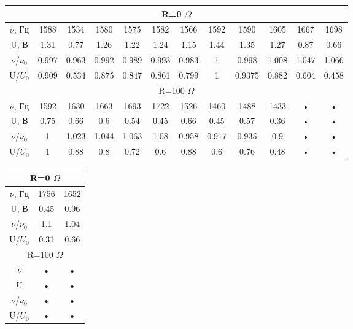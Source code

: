 \documentclass[a4paper,12pt]{article} %
\begin{document}
\begin{flushleft}

\begin {tabular}{|c|c|c|c|c|c|c|c|c|c|c|c|}
\hline 
\multicolumn{12}{|c|}{R=0 $\Omega$     }  \\ 
\hline 
$\nu$, Гц & 1588 & 1534 & 1580 & 1575 & 1582 & 1566 & 1592 & 1590 & 1605 & 1667 & 1698  \\ 
\hline 
U, В& 1.31 & 0.77 & 1.26 & 1.22 & 1.24 & 1.15 & 1.44 & 1.35 & 1.27 & 0.87 & 0.66  \\ 
\hline 
$\nu$/$\nu_0$ & 0.997 & 0.963 & 0.992 & 0.989 & 0.993 & 0.983 & 1 & 0.998 & 1.008 & 1.047 & 1.066  \\ 
\hline 
U/$U_0$ & 0.909 & 0.534 & 0.875 & 0.847 & 0.861 & 0.799 & 1 & 0.9375 & 0.882 & 0.604 & 0.458  \\ 
\hline 
\multicolumn{12}{|c|}{R=100 $\Omega$     }  \\  
\hline 
$\nu$, Гц & 1592 & 1630 & 1663 & 1693 & 1722 & 1526 & 1460 & 1488 & 1433 & • & •  \\ 
\hline 
U, В & 0.75 & 0.66 & 0.6 & 0.54 & 0.45 & 0.66 & 0.45 & 0.57 & 0.36 & • & • \\ 
\hline 
$\nu$/$\nu_0$ & 1 & 1.023 & 1.044 & 1.063 & 1.08 & 0.958 & 0.917 & 0.935 & 0.9 & • & •  \\ 
\hline 
U/$U_0$ & 1 & 0.88 & 0.8 & 0.72 & 0.6 & 0.88 & 0.6 & 0.76 & 0.48 & • & • \\ 
\hline 
\end{tabular} 
\end{flushleft}






\begin{center}


\begin {tabular}{|c|c|c|}
\hline 
\multicolumn{3}{|c|}{R=0 $\Omega$     }  \\ 
\hline 
$\nu$, Гц & 1756 & 1652 \\ 
\hline 
U, В&  0.45 & 0.96 \\ 
\hline 
$\nu$/$\nu_0$  & 1.1 & 1.04 \\ 
\hline 
U/$U_0$ &  0.31 & 0.66 \\ 
\hline 
\multicolumn{3}{|c|}{R=100 $\Omega$     }  \\  
\hline 
$\nu$ & • & • \\ 
\hline 
U &  • & • \\ 
\hline 
$\nu$/$\nu_0$ &  • & • \\ 
\hline 
U/$U_0$ &  • & • \\ 
\hline 
\end{tabular} 
\end{center}
\end{document}
